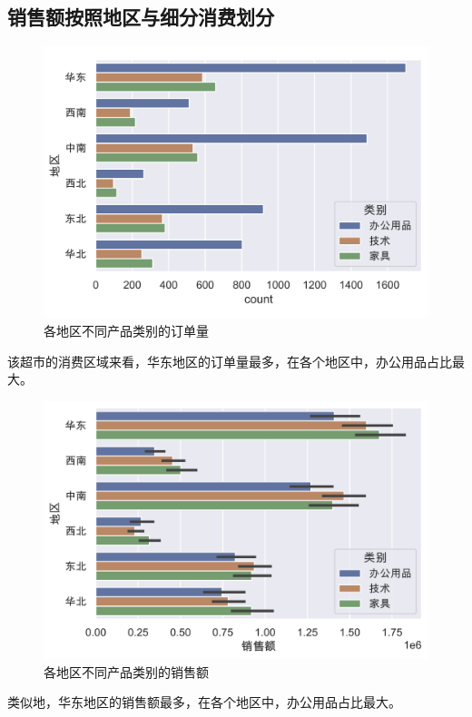 \documentclass[a4paper]{ctexart}
\begin{document}
\subsection{销售额按照地区与细分消费划分}
\begin{figure}[H]
    \centering
    \includegraphics[width=\textwidth]{figures/area_count}
    \caption{各地区不同产品类别的订单量}
\end{figure}
该超市的消费区域来看，华东地区的订单量最多，在各个地区中，办公用品占比最大。

\begin{figure}[H]
    \centering
    \includegraphics[width=\textwidth]{figures/area_total}
    \caption{各地区不同产品类别的销售额}
\end{figure}
类似地，华东地区的销售额最多，在各个地区中，办公用品占比最大。
\end{document}

